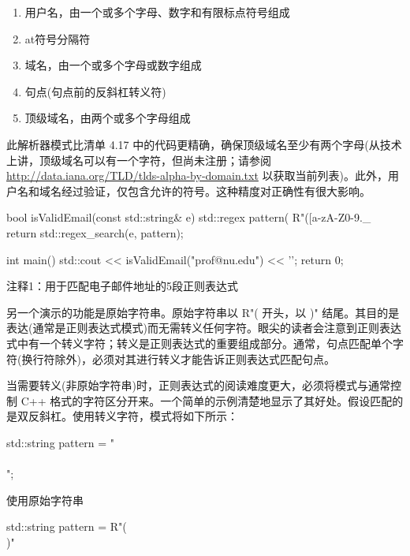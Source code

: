 \begin{enumerate}
\item
用户名，由一个或多个字母、数字和有限标点符号组成

\item
at符号分隔符

\item
域名，由一个或多个字母或数字组成

\item
句点(句点前的反斜杠转义符)

\item
顶级域名，由两个或多个字母组成
\end{enumerate}

此解析器模式比清单 4.17 中的代码更精确，确保顶级域名至少有两个字母(从技术上讲，顶级域名可以有一个字符，但尚未注册；请参阅 \url{http://data.iana.org/TLD/tlds-alpha-by-domain.txt} 以获取当前列表)。此外，用户名和域名经过验证，仅包含允许的符号。这种精度对正确性有很大影响。


\begin{cpp}
bool isValidEmail(const std::string& e) {
  std::regex pattern(
      R"([a-zA-Z0-9._%
  return std::regex_search(e, pattern);
}

int main() {
  std::cout << isValidEmail("prof@nu.edu") << '\n';
  return 0;
}
\end{cpp}

{\footnotesize
注释1：用于匹配电子邮件地址的5段正则表达式
}

另一个演示的功能是原始字符串。原始字符串以 R"( 开头，以 )" 结尾。其目的是表达(通常是正则表达式模式)而无需转义任何字符。眼尖的读者会注意到正则表达式中有一个转义字符；转义是正则表达式的重要组成部分。通常，句点匹配单个字符(换行符除外)，必须对其进行转义才能告诉正则表达式匹配句点。

当需要转义(非原始字符串)时，正则表达式的阅读难度更大，必须将模式与通常控制 C++ 格式的字符区分开来。一个简单的示例清楚地显示了其好处。假设匹配的是双反斜杠。使用转义字符，模式将如下所示：

\begin{cpp}
std::string pattern = "\\\\";
\end{cpp}

使用原始字符串

\begin{cpp}
std::string pattern = R"(\\)"
\end{cpp}

